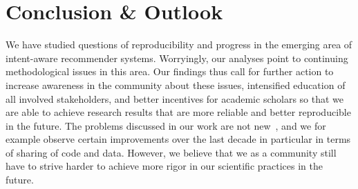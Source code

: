 \documentclass[sigconf,natbib=true,nonacm]{acmart}
\begin{document}
\section{Conclusion \& Outlook}
\label{sec:conclusion}
We have studied questions of reproducibility and progress in the emerging area of intent-aware recommender systems. Worryingly, our analyses point to continuing methodological issues in this area. Our findings thus call for further action to increase awareness in the community about these issues, intensified education of all involved stakeholders, and better incentives for academic scholars so that we are able to achieve research results that are more reliable and better reproducible in the future. The problems discussed in our work are not new~\cite{Konstan2013Toward}, and we for example observe certain improvements over the last decade in particular in terms of sharing of code and data. However, we believe that we as a community still have to strive harder to achieve more rigor in our scientific practices in the future.
\end{document}
